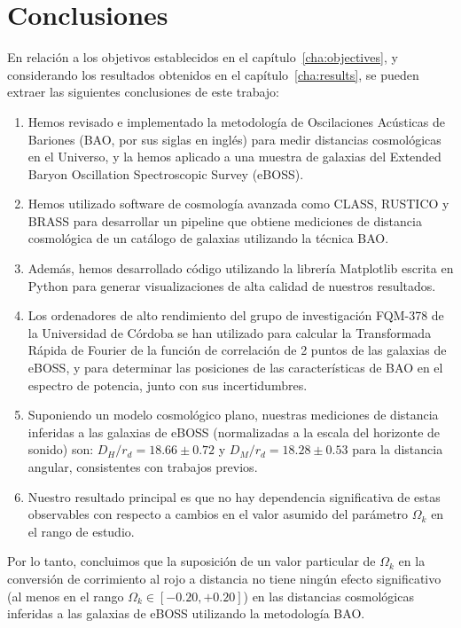 \chapter{Conclusiones}

En relación a los objetivos establecidos en el capítulo~\ref{cha:objectives}, y considerando los resultados obtenidos en el capítulo~\ref{cha:results}, se pueden extraer las siguientes conclusiones de este trabajo:

\begin{enumerate}
\item Hemos revisado e implementado la metodología de Oscilaciones Acústicas de Bariones (BAO, por sus siglas en inglés) para medir distancias cosmológicas en el Universo, y la hemos aplicado a una muestra de galaxias del Extended Baryon Oscillation Spectroscopic Survey (eBOSS).
\item Hemos utilizado software de cosmología avanzada como CLASS, RUSTICO y BRASS para desarrollar un pipeline que obtiene mediciones de distancia cosmológica de un catálogo de galaxias utilizando la técnica BAO.
\item Además, hemos desarrollado código utilizando la librería Matplotlib escrita en Python para generar visualizaciones de alta calidad de nuestros resultados.
\item Los ordenadores de alto rendimiento del grupo de investigación FQM-378 de la Universidad de Córdoba se han utilizado para calcular la Transformada Rápida de Fourier de la función de correlación de 2 puntos de las galaxias de eBOSS, y para determinar las posiciones de las características de BAO en el espectro de potencia, junto con sus incertidumbres.
\item Suponiendo un modelo cosmológico plano, nuestras mediciones de distancia inferidas a las galaxias de eBOSS (normalizadas a la escala del horizonte de sonido) son: $D_H/r_d = 18.66 \pm 0.72$ y $D_M/r_d = 18.28 \pm 0.53$ para la distancia angular, consistentes con trabajos previos.
\item Nuestro resultado principal es que no hay dependencia significativa de estas observables con respecto a cambios en el valor asumido del parámetro $ \Omega_k$ en el rango de estudio.
\end{enumerate}

Por lo tanto, concluimos que la suposición de un valor particular de $\Omega_k$ en la conversión de corrimiento al rojo a distancia no tiene ningún efecto significativo (al menos en el rango $\Omega_k \in [-0.20, +0.20]$) en las distancias cosmológicas inferidas a las galaxias de eBOSS utilizando la metodología BAO.

